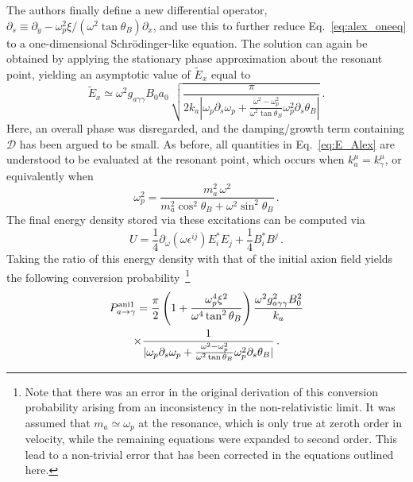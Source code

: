 \documentclass[twocolumn,superscriptaddress,floatfix,preprintnumbers,prd,nofootinbib,aps,10pt]{revtex4-2}
\renewcommand\({\left(}
\renewcommand\){\right)}
\renewcommand\[{\left[}
\renewcommand\]{\right]}
\begin{document}
The authors finally define a new differential operator, $\partial_s \equiv \partial_y - \omega_p^2 \xi /(\omega^2 \tan\theta_B) \partial_x$, and use this to further reduce Eq.~\ref{eq:alex_oneeq} to a one-dimensional Schr\"{o}dinger-like equation. The solution can again be obtained by applying the stationary phase approximation about the resonant point, yielding an asymptotic value of $\tilde{E}_x$ equal to
%
\begin{equation}\label{eq:E_Alex}
    \tilde{E}_x \simeq \omega^2 g_{a\gamma\gamma} B_0 a_0 \, \sqrt{\frac{\pi}{2 k_a |\omega_p \partial_s \omega_p + \frac{\omega^2 - \omega_p^2}{\omega^2 \tan\theta_B} \omega_p^2 \partial_s \theta_B|}} \, .
\end{equation}
%
Here, an overall phase was disregarded, and the damping/growth term containing $\mathcal{D}$ has been argued to be small. As before, all quantities in Eq.~\ref{eq:E_Alex} are understood to be evaluated at the resonant point, which occurs when $k_a^\mu = k_\gamma^\mu$, or equivalently when
%
\begin{equation}\label{eq:resP}
    \omega_p^2 = \frac{m_a^2 \, \omega^2}{m_a^2 \cos^2\theta_B + \omega^2 \sin^2\theta_B} \, .    
\end{equation}
%
The final energy density stored via these excitations can be computed via
%
\begin{equation}
    U = \frac{1}{4}\partial_\omega (\omega \epsilon^{ij}) E_i^* E_j + \frac{1}{4}B^*_i B^j \, .
\end{equation}
%
Taking the ratio of this energy density with that of the initial axion field yields the following conversion probability~\cite{millar2021axionphotonUPDATED}\footnote{Note that there was an error in the original derivation of this conversion probability arising from an inconsistency in the non-relativistic limit. It was assumed that $m_a \simeq \omega_p$ at the resonance, which is only true at zeroth order in velocity, while the remaining equations were expanded to second order. This lead to a non-trivial error that has been corrected in the equations outlined here.}
%
\begin{multline}\label{eq:pa_alex}
    P_{a \rightarrow \gamma}^{\rm ani1} = \frac{\pi}{2} \left(1 + \frac{\omega_p^4 \xi^2}{\omega^4 \tan^2 \theta_B}\right) \frac{\omega^2 g_{a\gamma\gamma}^2 B_0^2}{k_a} \\
    \times \frac{1}{|\omega_p \partial_s \omega_p + \frac{\omega^2 - \omega_p^2}{\omega^2 \tan\theta_B} \omega_p^2 \partial_s \theta_B|} \, .
\end{multline}
\end{document}
